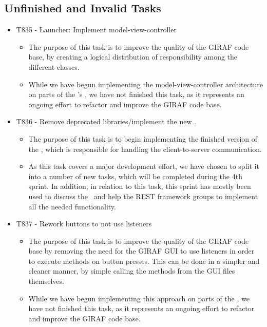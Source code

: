 \subsection{Unfinished and Invalid Tasks}\label{S3Invalid}
\begin{itemize}
  \item T835 - Launcher: Implement model-view-controller
  \begin{itemize}
      \item The purpose of this task is to improve the quality of the GIRAF code
      base, by creating a logical distribution of responsibility among the different
      classes.
      \item While we have begun implementing the model-view-controller architecture
      on parts of the \lapp's , we have not finished this task,
      as it represents an ongoing effort to refactor and improve the GIRAF code base.
  \end{itemize}
  \item T836 - Remove deprecated libraries/implement the new \rlib.
  \begin{itemize}
      \item The purpose of this task is to begin implementing the finished version
      of the \rlib, which is responsible for handling the
      client-to-server communication.
      \item As this task covers a major development effort, we have chosen to split
      it into a number of new tasks, which will be completed during the 4th sprint.
      In addition, in relation to this task, this sprint has mostly been used to
      discuss the \rlib\ and help the REST framework groups to implement all the
      needed functionality.  
      \end{itemize}
  \item T837 - Rework buttons to not use listeners
  \begin{itemize}
    \item The purpose of this task is to improve the quality of the GIRAF code
    base by removing the need for the GIRAF GUI to use listeners in order to
    execute methods on button presses. This can be done in a simpler and cleaner
    manner, by simple calling the methods from the GUI  files
    themselves.
    \item While we have begun implementing this approach on parts of the \lapp,
    we have not finished this task, as it represents an ongoing effort to refactor and improve the GIRAF code base.
  \end{itemize}
\end{itemize}

